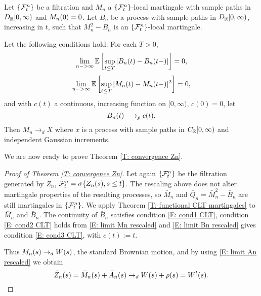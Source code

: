 \begin{theorem} \label{T: functional CLT martingales}
	Let $\{\mathcal{F}^n_{t}\}$ be a filtration and $M_n$ a $\{\mathcal{F}^n_{t}\}$-local martingale with sample paths in $D_{\mathbb{R}}[0,\infty)$ and $M_n(0)=0$.
	Let $B_n$ be a process with sample paths in $D_{\mathbb{R}}[0,\infty)$, increasing in $t$, such that $M_n^2 - B_n$ is an $\{\mathcal{F}^n_{t}\}$-local martingale.
	
	Let the following conditions hold:
	For each $T>0$,
	\begin{equation} \label{E: cond1 CLT}
	\lim_{n->\infty} \mathbb{E} \left[ 
	\sup_{t \leq T} | B_n(t) - B_n(t-)|
     \right] = 0,
	\end{equation}
	\begin{equation} \label{E: cond2 CLT}
	\lim_{n->\infty} \mathbb{E} \left[ 
		\sup_{t \leq T} | M_n(t) - M_n(t-)|^2
	 \right] = 0,
	\end{equation}
	and with $c(t)$ a continuous, increasing function on $[0, \infty)$, $c(0) = 0$, let
	\begin{equation} \label{E: cond3 CLT}
	B_n(t) \longrightarrow_p c(t).
	\end{equation}
	Then $M_n \longrightarrow_d X$ where $x$ is a process with sample paths in $C_{\mathbb{R}}[0,\infty)$ and independent Gaussian increments.
\end{theorem}


We are now ready to prove Theorem \ref{T: convergence Zn}.

\begin{proof}[Proof of Theorem \ref{T: convergence Zn}]
	Let again $\{\mathcal{F}^n_{t}\}$ be the filtration generated by $Z_n$, 
	$\mathcal{F}^n_{t} = \sigma \{ Z_n(s), s \leq t \}$.
	The rescaling above does not alter martingale properties of the resulting processes,
	so $\bar{M}_n$ and $\bar{Q}_n = \bar{M}_n^2 - \bar{B}_n$ are still martingales in $\{\mathcal{F}^n_{t}\}$.
	We apply Theorem \ref{T: functional CLT martingales} to $\bar{M}_n$ and $\bar{B}_n$.
	The continuity of $\bar{B}_n$ satisfies condition \ref{E: cond1 CLT}, 
	condition \ref{E: cond2 CLT} holds from \ref{E: limit Mn rescaled}
	and \ref{E: limit Bn rescaled} gives condition \ref{E: cond3 CLT}, with $c(t) := t$.
	
	Thus $\bar{M}_n(s) \rightarrow_d W(s)$, the standard Brownian motion, and by using \ref{E: limit An rescaled} we obtain
	\begin{equation*}
	\bar{Z}_n(s) = \bar{M}_n(s) + \bar{A}_n(s) \rightarrow_d W(s) + \rho (s) = W^t(s).
	\end{equation*}
			
\end{proof}

